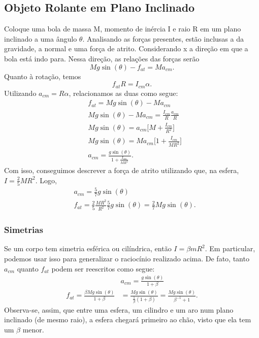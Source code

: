 \documentclass{article}
\begin{document}
\subsection{Objeto Rolante em Plano Inclinado}
Coloque uma bola de massa M, momento de inércia I e raio R em um plano inclinado a uma ângulo \(\theta \).
Analisando as forças presentes, estão inclusas a da gravidade, a normal e uma força de atrito. Considerando x a direção em que a bola
está indo para. Nessa direção, as relações das forças serão 
\[
  Mg\sin{(\theta )} - f_{at} = Ma_{cm}.
\]
Quanto à rotação, temos 
\[
  f_{at}R = I_{cm}\alpha.
\]
Utilizando \(a_{cm} = R\alpha \), relacionamos as duas como segue:
\begin{align*}
   &f_{at} = Mg\sin{(\theta )} - Ma_{cm}\\
   &Mg\sin{(\theta )} - Ma_{cm} = \frac{I_{cm}}{R}\frac{a_{cm}}{R}\\
   &Mg\sin{(\theta )} = a_{cm}\biggl[M + \frac{I_{cm}}{R^{2}}\biggr]\\
   &Mg\sin{(\theta )} = Ma_{cm}\biggl[1 + \frac{I_{cm}}{MR^{2}}\biggr]\\
   &a_{cm} = \frac{g\sin{(\theta )}}{1 + \frac{I_{cm}}{MR^{2}}}.
\end{align*}
Com isso, conseguimos descrever a força de atrito utilizando que, na esfera, \(I = \frac{2}{5}MR^{2}\). Logo, 
\begin{align*}
   &a_{cm} = \frac{5}{7}g\sin{(\theta )}\\
   &f_{at} = \frac{2}{5}\frac{MR^{2}}{R^{2}}\frac{5}{7}g\sin{(\theta )} = \frac{2}{7}Mg\sin{(\theta )}.
\end{align*}
\subsubsection{Simetrias}
Se um corpo tem simetria esférica ou cilíndrica, então \(I = \beta mR^{2}\). Em particular, podemos usar isso para
generalizar o raciocínio realizado acima. De fato, tanto \(a_{cm}\) quanto \(f_{at}\) podem ser reescritos como segue:
\begin{align*}
  &a_{cm} = \frac{g\sin{(\theta )}}{1+\beta }\\
  f_{at} = \frac{\beta Mg\sin{(\theta )}}{1+\beta }& = \frac{Mg\sin{(\theta )}}{\frac{1}{\beta }(1+\beta )} = \frac{Mg\sin{(\theta )}}{\beta^{-1}+1}.
\end{align*}
Observa-se, assim, que entre uma esfera, um cilindro e um aro num plano inclinado (de mesmo raio), a esfera chegará primeiro ao chão,
visto que ela tem um \(\beta \) menor.
\end{document}
